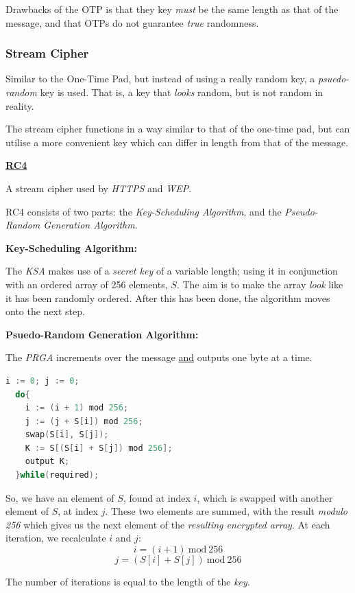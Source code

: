 \documentclass{article}
\begin{document}
Drawbacks of the OTP is that they key \textit{must} be the same length as that of the message, and that OTPs do not guarantee \textit{true} randomness.

\subsubsection{Stream Cipher}

Similar to the One-Time Pad, but instead of using a really random key, a \textit{psuedo-random} key is used. That is, a key that \textit{looks} random, but is not random in reality.

The stream cipher functions in a way similar to that of the one-time pad, but can utilise a more convenient key which can differ in length from that of the message.

\newpage
\textbf{\underline{RC4}}

A stream cipher used by \textit{HTTPS} and \textit{WEP}.

RC4 consists of two parts: the \textit{Key-Scheduling Algorithm}, and the \textit{Pseudo-Random Generation Algorithm}.

\textbf{Key-Scheduling Algorithm:}

The \textit{KSA} makes use of a \textit{secret key} of a variable length; using it in conjunction with an ordered array of 256 elements, $S$. The aim is to make the array \textit{look} like it has been randomly ordered. After this has been done, the algorithm moves onto the next step.

\textbf{Psuedo-Random Generation Algorithm:}

The \textit{PRGA} increments over the message \underline{and} outputs one byte at a time.

\begin{lstlisting}[language=C]
  i := 0; j := 0;
  do{
    i := (i + 1) mod 256;
    j := (j + S[i]) mod 256;
    swap(S[i], S[j]);
    K := S[(S[i] + S[j]) mod 256];
    output K;
  }while(required);
\end{lstlisting}

So, we have an element of $S$, found at index $i$, which is swapped with another element of $S$, at index $j$. These two elements are summed, with the result \textit{modulo 256} which gives us the next element of the \textit{resulting encrypted array}. At each iteration, we recalculate $i$ and $j$:
\[ i = (i + 1)\:\text{mod}\:256\]
\[ j = (S[i] + S[j])\:\text{mod}\:256\]

The number of iterations is equal to the length of the \textit{key}.
\end{document}
